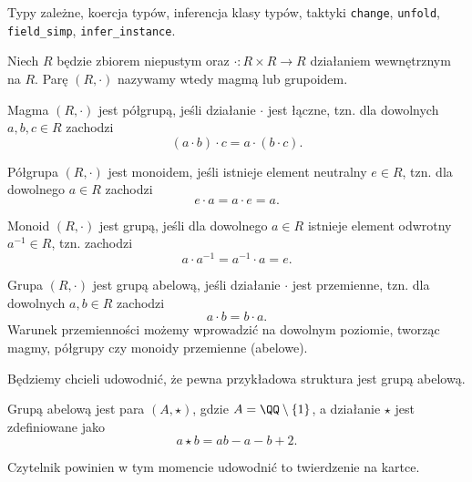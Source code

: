 \documentclass[polish,pretty,bibliography=totocnumbered]{angav}
\newcommand{\Lean}[1]{\texttt{#1}}
\begin{document}
\begin{lesson-goals}
  Typy zależne, koercja typów, inferencja klasy typów, taktyki \Lean{change}, \Lean{unfold}, \Lean{field_simp}, \Lean{infer_instance}.
\end{lesson-goals}

\begin{definition}[magma]
    Niech $R$ będzie zbiorem niepustym oraz $\cdot : R \times R \to R$ działaniem wewnętrznym na $R$. Parę $(R, \cdot)$ nazywamy wtedy magmą lub grupoidem.
\end{definition}

\begin{definition}[półgrupa]
    Magma $(R, \cdot)$ jest półgrupą, jeśli działanie $\cdot$ jest łączne, tzn. dla dowolnych $a, b, c \in R$ zachodzi
    \[ (a \cdot b) \cdot c = a \cdot (b \cdot c). \]
\end{definition}

\begin{definition}[monoid]
    Półgrupa $(R, \cdot)$ jest monoidem, jeśli istnieje element neutralny $e \in R$, tzn. dla dowolnego $a \in R$ zachodzi
    \[ e \cdot a = a \cdot e = a. \]
\end{definition}

\begin{definition}[grupa]
    Monoid $(R, \cdot)$ jest grupą, jeśli dla dowolnego $a \in R$ istnieje element odwrotny $a^{-1} \in R$, tzn. zachodzi
    \[ a \cdot a^{-1} = a^{-1} \cdot a = e. \]
\end{definition}

\begin{definition}
    Grupa $(R, \cdot)$ jest grupą abelową, jeśli działanie $\cdot$ jest przemienne, tzn. dla dowolnych $a, b \in R$ zachodzi
    \[ a \cdot b = b \cdot a. \]
    Warunek przemienności możemy wprowadzić na dowolnym poziomie, tworząc magmy, półgrupy czy monoidy przemienne (abelowe).
\end{definition}

Będziemy chcieli udowodnić, że pewna przykładowa struktura jest grupą abelową.

\begin{theorem}
    Grupą abelową jest para $(A, \star)$, gdzie $A = \QQ \setminus \{1\}$, a działanie $\star$ jest zdefiniowane jako
    \[ a \star b = ab - a - b + 2. \]
\end{theorem}

Czytelnik powinien w tym momencie udowodnić to twierdzenie na kartce.
\end{document}

